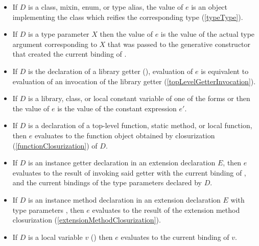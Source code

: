 \documentclass[makeidx]{article}
\begin{document}
{\begin{itemize}
\item
  If $D$ is a class, mixin, enum, or type alias,
  the value of $e$ is an object implementing the class 
  which reifies the corresponding type
  (\ref{typeType}).
\item
  If $D$ is a type parameter $X$ then the value of $e$ is
  the value of the actual type argument corresponding to $X$
  that was passed to the generative constructor that created
  the current binding of \THIS.
\item
  If $D$ is the declaration of a library getter
  (),
  evaluation of $e$ is equivalent to evaluation of an invocation of
  the library getter \id{}
  (\ref{topLevelGetterInvocation}).
\item
  If $D$ is a library, class, or local constant variable of one of the forms
   or 
  then the value of $e$ is the value of the constant expression $e'$.
\item
  If $D$ is a declaration of
  a top-level function, static method, or local function,
  then $e$ evaluates to the function object obtained by closurization
  (\ref{functionClosurization})
  of $D$.
\item
  If $D$ is an instance getter declaration in an extension declaration $E$,
  then $e$ evaluates to the result of invoking said getter
  with the current binding of \THIS, and
  the current bindings of the type parameters declared by $D$.
\item
  If $D$ is an instance method declaration in an extension declaration $E$
  with type parameters ,
  then $e$ evaluates to the result of the extension method closurization
  (\ref{extensionMethodClosurization}).
\item
  If $D$ is a local variable $v$
  ()
  then $e$ evaluates to the current binding of $v$.
\end{itemize}

\EndCase

}
\end{document}
